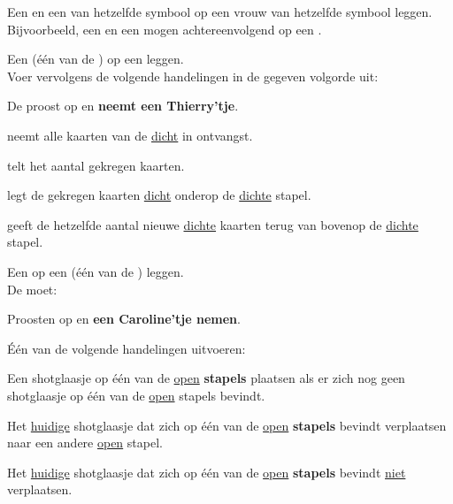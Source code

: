 
\vervolgLijstKlein{}
\item \label{zet:dubbel} Een  en een  van hetzelfde symbool op een vrouw van hetzelfde symbool leggen. Bijvoorbeeld, een  en een  mogen achtereenvolgend op een .
\eindLijst{}


\vervolgLijstKlein{}
\item Een  (\'e\'en van de ) op een  leggen. \\Voer vervolgens de volgende handelingen in de gegeven volgorde uit:
\puntLijst{}
\item De \huidigeSpeler proost op  en \textbf{neemt een Thierry'tje}\footnotemark[2].
\item \Frits neemt alle kaarten van de \huidigeSpeler \ul{dicht} in ontvangst.
\item \Frits telt het aantal gekregen kaarten.
\item \Frits legt de gekregen kaarten \ul{dicht} onderop de \ul{dichte} stapel.
\item \Frits geeft de \huidigeSpeler hetzelfde aantal nieuwe \ul{dichte} kaarten terug van bovenop de \ul{dichte} stapel.
\eindPuntLijst{}
\label{zet:thierry}
\eindLijst{}

\vervolgLijstKlein{}
\item Een  op een  (\'e\'en van de ) leggen. \\De \huidigeSpeler moet:
\puntLijst{}
\item Proosten op  en \textbf{een Caroline'tje nemen}\footnotemark[3].
\item Één van de volgende handelingen uitvoeren:
\numeriekeLijst{}
\item Een shotglaasje op \'e\'en van de \ul{open} \textbf{stapels} plaatsen als er zich nog geen shotglaasje op \'e\'en van de \ul{open} stapels bevindt.
\item Het \ul{huidige} shotglaasje dat zich op \'e\'en van de \ul{open} \textbf{stapels} bevindt verplaatsen naar een andere \ul{open} stapel.
\item Het \ul{huidige} shotglaasje dat zich op \'e\'en van de \ul{open} \textbf{stapels} bevindt \ul{niet} verplaatsen.
\eindNumeriekeLijst{}
\eindPuntLijst{}
\label{zet:caroline}
\eindLijst{}



